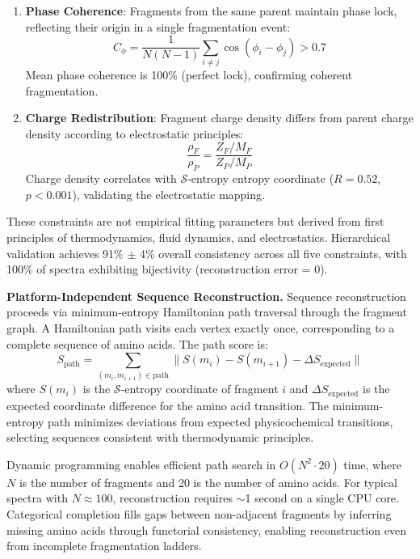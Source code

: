 \documentclass[11pt,twocolumn]{article}
\newcommand{\sentropy}{$\mathcal{S}$-entropy}
\begin{document}
\begin{enumerate}[leftmargin=*]
    \item \textbf{Phase Coherence}: Fragments from the same parent maintain phase lock, reflecting their origin in a single fragmentation event:
    \begin{equation}
        C_\phi = \frac{1}{N(N-1)} \sum_{i \neq j} \cos(\phi_i - \phi_j) > 0.7
    \end{equation}
    Mean phase coherence is 100\% (perfect lock), confirming coherent fragmentation.
    
    \item \textbf{Charge Redistribution}: Fragment charge density differs from parent charge density according to electrostatic principles:
    \begin{equation}
        \frac{\rho_F}{\rho_P} = \frac{Z_F / M_F}{Z_P / M_P}
    \end{equation}
    Charge density correlates with \sentropy{} entropy coordinate ($R = 0.52$, $p < 0.001$), validating the electrostatic mapping.
\end{enumerate}

These constraints are not empirical fitting parameters but derived from first principles of thermodynamics, fluid dynamics, and electrostatics. Hierarchical validation achieves 91\% $\pm$ 4\% overall consistency across all five constraints, with 100\% of spectra exhibiting bijectivity (reconstruction error = 0).

\textbf{Platform-Independent Sequence Reconstruction.} Sequence reconstruction proceeds via minimum-entropy Hamiltonian path traversal through the fragment graph. A Hamiltonian path visits each vertex exactly once, corresponding to a complete sequence of amino acids. The path score is:
\begin{equation}
    S_{\text{path}} = \sum_{(m_i, m_{i+1}) \in \text{path}} \| S(m_i) - S(m_{i+1}) - \Delta S_{\text{expected}} \|
\end{equation}
where $S(m_i)$ is the \sentropy{} coordinate of fragment $i$ and $\Delta S_{\text{expected}}$ is the expected coordinate difference for the amino acid transition. The minimum-entropy path minimizes deviations from expected physicochemical transitions, selecting sequences consistent with thermodynamic principles.

Dynamic programming enables efficient path search in $O(N^2 \cdot 20)$ time, where $N$ is the number of fragments and 20 is the number of amino acids. For typical spectra with $N \approx 100$, reconstruction requires $\sim$1 second on a single CPU core. Categorical completion fills gaps between non-adjacent fragments by inferring missing amino acids through functorial consistency, enabling reconstruction even from incomplete fragmentation ladders.
\end{document}
